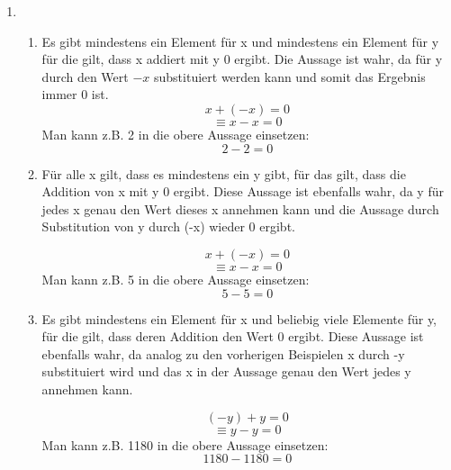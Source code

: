 \documentclass[a4paper]{article}
\begin{document}
	\begin{enumerate}
		\item
		\begin{enumerate}
			\item
			Es gibt mindestens ein Element für x und mindestens ein Element für y für die gilt, dass x addiert mit y 0 ergibt.
			\newline
			Die Aussage ist wahr, da für y durch den Wert $-x$ substituiert werden kann und somit das Ergebnis immer 0 ist.
			\begin{equation*}
				x + (-x) = 0
			\end{equation*}
			\begin{equation*}
				\equiv x - x = 0
			\end{equation*}
			Man kann z.B. 2 in die obere Aussage einsetzen:
			\begin{equation*}
				2 - 2 = 0
			\end{equation*}
			
			\item
			Für alle x gilt, dass es mindestens ein y gibt, für das gilt, dass die Addition von x mit y 0 ergibt.
			\newline
			Diese Aussage ist ebenfalls wahr, da y für jedes x genau den Wert dieses x annehmen kann und die Aussage durch Substitution von y durch (-x) wieder 0 ergibt.
			
			\begin{equation*}
				x + (-x) = 0
			\end{equation*}
			\begin{equation*}
				\equiv x - x = 0
			\end{equation*}
			Man kann z.B. 5 in die obere Aussage einsetzen:
			\begin{equation*}
				5 - 5 = 0
			\end{equation*}
			
			\item
			Es gibt mindestens ein Element für x und beliebig viele Elemente für y, für die gilt, dass deren Addition den Wert 0 ergibt.
			\newline
			Diese Aussage ist ebenfalls wahr, da analog zu den vorherigen Beispielen x durch -y substituiert wird und das x in der Aussage genau den Wert jedes y annehmen kann.
			
			\begin{equation*}
				(-y) + y = 0
			\end{equation*}
			\begin{equation*}
				\equiv y - y = 0
			\end{equation*}
			Man kann z.B. 1180 in die obere Aussage einsetzen:
			\begin{equation*}
				1180 - 1180 = 0
			\end{equation*}
			

\end{enumerate}
\end{enumerate}
\end{document}
